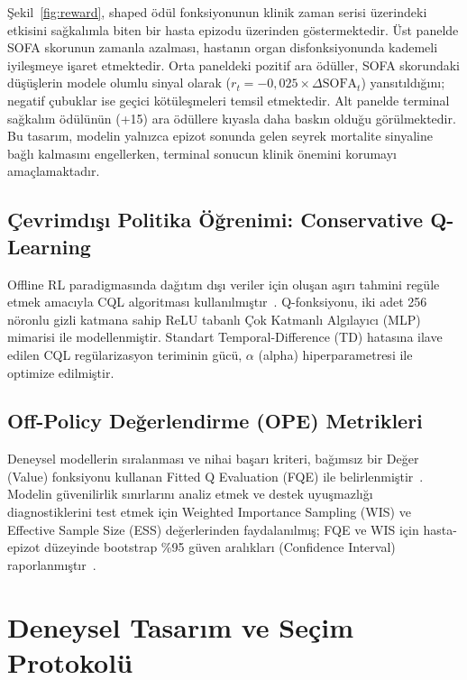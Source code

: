 \documentclass[11pt,a4paper]{article}
\begin{document}
Şekil~\ref{fig:reward}, shaped ödül fonksiyonunun klinik zaman serisi üzerindeki etkisini sağkalımla biten bir hasta epizodu üzerinden göstermektedir. Üst panelde SOFA skorunun zamanla azalması, hastanın organ disfonksiyonunda kademeli iyileşmeye işaret etmektedir. Orta paneldeki pozitif ara ödüller, SOFA skorundaki düşüşlerin modele olumlu sinyal olarak ($r_t = -0{,}025 \times \Delta\text{SOFA}_t$) yansıtıldığını; negatif çubuklar ise geçici kötüleşmeleri temsil etmektedir. Alt panelde terminal sağkalım ödülünün (+15) ara ödüllere kıyasla daha baskın olduğu görülmektedir. Bu tasarım, modelin yalnızca epizot sonunda gelen seyrek mortalite sinyaline bağlı kalmasını engellerken, terminal sonucun klinik önemini korumayı amaçlamaktadır.

\subsection{Çevrimdışı Politika Öğrenimi: Conservative Q-Learning}
Offline RL paradigmasında dağıtım dışı veriler için oluşan aşırı tahmini regüle etmek amacıyla CQL algoritması kullanılmıştır~\cite{kumar2020cql}. Q-fonksiyonu, iki adet 256 nöronlu gizli katmana sahip ReLU tabanlı Çok Katmanlı Algılayıcı (MLP) mimarisi ile modellenmiştir. Standart Temporal-Difference (TD) hatasına ilave edilen CQL regülarizasyon teriminin gücü, $\alpha$ (alpha) hiperparametresi ile optimize edilmiştir.

\subsection{Off-Policy Değerlendirme (OPE) Metrikleri}
Deneysel modellerin sıralanması ve nihai başarı kriteri, bağımsız bir Değer (Value) fonksiyonu kullanan Fitted Q Evaluation (FQE) ile belirlenmiştir~\cite{voloshin2021empirical}. Modelin güvenilirlik sınırlarını analiz etmek ve destek uyuşmazlığı diagnostiklerini test etmek için Weighted Importance Sampling (WIS) ve Effective Sample Size (ESS) değerlerinden faydalanılmış; FQE ve WIS için hasta-epizot düzeyinde bootstrap \%95 güven aralıkları (Confidence Interval) raporlanmıştır~\cite{hao2021bootstrapping,thomas2015highconfidence}.

\section{Deneysel Tasarım ve Seçim Protokolü}
\end{document}
